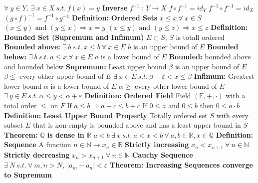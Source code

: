 \documentclass[14pt]{extarticle}
\def\Definition{{\color{Blue} \textbf{Definition:} }}
\def\Theorem{{\color{Red} \textbf{Theorem:} }}
\begin{document}
\begin{outline}
				\3	$\forall~y \in Y,~\exists~x \in X~s.t.~f(x) = y$
			\2	\textbf{Inverse}
				\3	$f^{-1}~:~Y \rightarrow X$
				\3	$f \circ f^{-1} = id_Y$
				\3	$f^{-1} \circ f^{-1} = id_X$
				\3	$(g \circ f)^{-1} = f^{-1} \circ g^{-1}$
		\1	\Definition \textbf{Ordered Sets}
			\2	$x \le x~\forall~x \in S$
			\2	$(x \le y) \text{ and } (y \le x) \Rightarrow x = y$
			\2	$(x \le y) \text{ and } (y \le z) \Rightarrow x \le z$
		\1	\Definition \textbf{Bounded Set (Supremum and Infimum)}
			\2	$E \subset S$, $S$ is totall ordered
			\2	\textbf{Bounded above: } $\exists~b~s.t.~x \le b~\forall~x \in E$
				\3	$b$ is an upper bound of $E$
			\2	\textbf{Bounded below: } $\exists~b~s.t.~a \le x~\forall~x \in E$
				\3	$a$ is a lower bound of $E$
			\2	\textbf{Bounded: } bounded above and bounded below
			\2	\textbf{Supremum: } Least upper bound
				\3	$\beta$ is an upper bound of $E$
				\3	$\beta \le $ every other upper bound of $E$
				\3	$\exists~x\in E~s.t.~\beta - \varepsilon < x \le \beta$
			\2	\textbf{Infimum: } Greatest lower bound
				\3	$\alpha$ is a lower bound of $E$
				\3	$\alpha \ge $ every other lower bound of $E$
				\3	$\exists~y\in E~s.t.~\alpha \le y < \alpha + \varepsilon$
		\1	\Definition \textbf{Ordered Field}
			\2	Field $(\mathbb{F},+,\cdot)$ with a total order $\le$ on $F$
			\2	If $a \le b \Rightarrow a + c \le b + c$
			\2	If $0 \le a$ and $0 \le b$ then $0 \le a \cdot b$
		\1	\Definition \textbf{Least Upper Bound Property}
			\2	Totally ordered set $S$ with every subset $E$ that is non-empty is bounded
					above and has a least upper bound in $S$
		\1	\Theorem \textbf{$\mathbb{Q}$ is dense in $\mathbb{R}$}
			\2	$a < b~\exists~x~s.t.~a < x < b~\forall~a,b \in \mathbb{R},x \in \mathbb{Q}$
		\1	\Definition \textbf{Sequence}
			\2	A function $n \in \mathbb{N} \rightarrow x_n \in \mathbb{R}$
			\2	\textbf{Strictly increasing}
				\3	$x_n < x_{n+1}~\forall~n \in \mathbb{N}$
			\2	\textbf{Strictly decreasing}
				\3	$x_n > x_{n+1}~\forall~n \in \mathbb{N}$
			\2	\textbf{Cauchy Sequence}
				\3	$\exists~N~s.t.~\forall~m,n > N,~|a_m - a_n| < \varepsilon$
		\1	\Theorem \textbf{Increasing Sequences converge to Supremum}

\end{outline}
\end{document}
